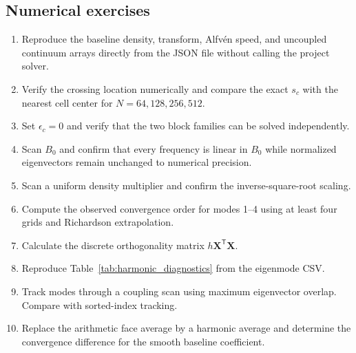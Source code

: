 \subsection{Numerical exercises}
\begin{enumerate}[leftmargin=1.8em]
\item Reproduce the baseline density, transform, Alfv\'en speed, and uncoupled continuum arrays directly from the JSON file without calling the project solver.
\item Verify the crossing location numerically and compare the exact $s_c$ with the nearest cell center for $N=64,128,256,512$.
\item Set $\epsilon_c=0$ and verify that the two block families can be solved independently.
\item Scan $B_0$ and confirm that every frequency is linear in $B_0$ while normalized eigenvectors remain unchanged to numerical precision.
\item Scan a uniform density multiplier and confirm the inverse-square-root scaling.
\item Compute the observed convergence order for modes 1--4 using at least four grids and Richardson extrapolation.
\item Calculate the discrete orthogonality matrix $h\mathbf X^{\mathsf T}\mathbf X$.
\item Reproduce Table~\ref{tab:harmonic_diagnostics} from the eigenmode CSV.
\item Track modes through a coupling scan using maximum eigenvector overlap. Compare with sorted-index tracking.
\item Replace the arithmetic face average by a harmonic average and determine the convergence difference for the smooth baseline coefficient.
\end{enumerate}

